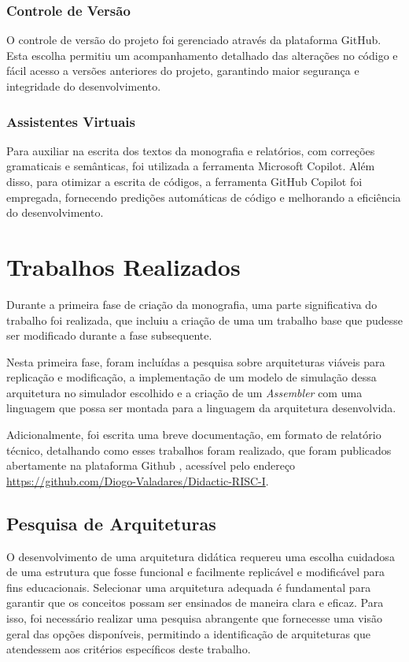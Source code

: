 \documentclass[
	12pt,				%
	openright,			%
	oneside,			%
	a4paper,			%
	english,			%
	french,				%
	spanish,			%
	brazil,				%
	]{abntex2}
\begin{document}
\subsection{Controle de Versão}
O controle de versão do projeto foi gerenciado através da plataforma GitHub. Esta escolha permitiu um acompanhamento detalhado das alterações no código e fácil acesso a versões anteriores do projeto, garantindo maior segurança e integridade do desenvolvimento.

\subsection{Assistentes Virtuais}
Para auxiliar na escrita dos textos da monografia e relatórios, com correções gramaticais e semânticas, foi utilizada a ferramenta Microsoft Copilot. Além disso, para otimizar a escrita de códigos, a ferramenta GitHub Copilot foi empregada, fornecendo predições automáticas de código e melhorando a eficiência do desenvolvimento.

\chapter{Trabalhos Realizados}

Durante a primeira fase de criação da monografia, uma parte significativa do trabalho foi realizada, que incluiu a criação de uma um trabalho base que pudesse ser modificado durante a fase subsequente. 

Nesta primeira fase, foram incluídas a pesquisa sobre arquiteturas viáveis para replicação e modificação, a implementação de um modelo de simulação dessa arquitetura no simulador escolhido e a criação de um \textit{Assembler} com uma linguagem que possa ser montada para a linguagem da arquitetura desenvolvida. 

Adicionalmente, foi escrita uma breve documentação, em formato de relatório técnico, detalhando como esses trabalhos foram realizado, que foram publicados abertamente na plataforma Github \cite{valadares_didactic-risc-i_2024}, acessível pelo endereço \url{https://github.com/Diogo-Valadares/Didactic-RISC-I}.

\section{Pesquisa de Arquiteturas}

O desenvolvimento de uma arquitetura didática requereu uma escolha cuidadosa de uma estrutura que fosse funcional e facilmente replicável e modificável para fins educacionais. Selecionar uma arquitetura adequada é fundamental para garantir que os conceitos possam ser ensinados de maneira clara e eficaz. Para isso, foi necessário realizar uma pesquisa abrangente que fornecesse uma visão geral das opções disponíveis, permitindo a identificação de arquiteturas que atendessem aos critérios específicos deste trabalho.
\end{document}

